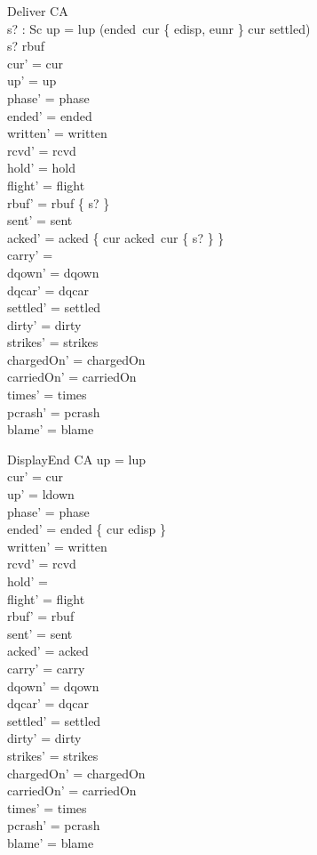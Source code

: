\documentclass[a4paper,10pt,fleqn]{article}
\begin{document}
\begin{schema}{Deliver}
  \Delta CA \\
  s? : Sc
\where
  up = lup \lor (ended~cur \in \{ edisp, eunr \} \land cur \notin settled) \\
  s? \in rbuf \\
  cur' = cur \\
  up' = up \\
  phase' = phase \\
  ended' = ended \\
  written' = written \\
  rcvd' = rcvd \\
  hold' = hold \\
  flight' = flight \\
  rbuf' = rbuf \setminus \{ s? \} \\
  sent' = sent \\
  acked' = acked \oplus \{ cur \mapsto acked~cur \cup \{ s? \} \} \\
  carry' = \emptyset \\
  dqown' = dqown \\
  dqcar' = dqcar \\
  settled' = settled \\
  dirty' = dirty \\
  strikes' = strikes \\
  chargedOn' = chargedOn \\
  carriedOn' = carriedOn \\
  times' = times \\
  pcrash' = pcrash \\
  blame' = blame
\end{schema}

\begin{schema}{DisplayEnd}
  \Delta CA
\where
  up = lup \\
  cur' = cur \\
  up' = ldown \\
  phase' = phase \\
  ended' = ended \oplus \{ cur \mapsto edisp \} \\
  written' = written \\
  rcvd' = rcvd \\
  hold' = \emptyset \\
  flight' = flight \\
  rbuf' = rbuf \\
  sent' = sent \\
  acked' = acked \\
  carry' = carry \\
  dqown' = dqown \\
  dqcar' = dqcar \\
  settled' = settled \\
  dirty' = dirty \\
  strikes' = strikes \\
  chargedOn' = chargedOn \\
  carriedOn' = carriedOn \\
  times' = times \\
  pcrash' = pcrash \\
  blame' = blame
\end{schema}
\end{document}
